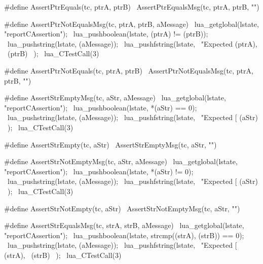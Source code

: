 #define AssertPtrEquals(tc, ptrA, ptrB) \
  AssertPtrEqualsMsg(tc, ptrA, ptrB, "")
\stopCHeader

\stopTestSuite

\startTestSuite[assertPtrNotEquals]

\startCHeader
#define AssertPtrNotEqualsMsg(tc, ptrA, ptrB, aMessage) \
  lua_getglobal(lstate, "reportCAssertion");            \
  lua_pushboolean(lstate, (ptrA) != (ptrB));            \
  lua_pushstring(lstate, (aMessage));                   \
  lua_pushfstring(lstate,                               \
      "Expected %
      (ptrA),                                           \
      (ptrB)                                            \
    );                                                  \
  lua_CTestCall(3)

#define AssertPtrNotEquals(tc, ptrA, ptrB) \
  AssertPtrNotEqualsMsg(tc, ptrA, ptrB, "")
\stopCHeader

\stopTestSuite

\startTestSuite[assertStrEmpty]

\startCHeader
#define AssertStrEmptyMsg(tc, aStr, aMessage) \
  lua_getglobal(lstate, "reportCAssertion");  \
  lua_pushboolean(lstate, *(aStr) == 0);      \
  lua_pushstring(lstate, (aMessage));         \
  lua_pushfstring(lstate,                     \
      "Expected [%
      (aStr)                                  \
    );                                        \
  lua_CTestCall(3)

#define AssertStrEmpty(tc, aStr) \
  AssertStrEmptyMsg(tc, aStr, "")
\stopCHeader

\stopTestSuite

\startTestSuite[assertStrNotEmpty]

\startCHeader
#define AssertStrNotEmptyMsg(tc, aStr, aMessage) \
  lua_getglobal(lstate, "reportCAssertion");     \
  lua_pushboolean(lstate, *(aStr) != 0);         \
  lua_pushstring(lstate, (aMessage));            \
  lua_pushfstring(lstate,                        \
      "Expected [%
      (aStr)                                     \
    );                                           \
  lua_CTestCall(3)

#define AssertStrNotEmpty(tc, aStr) \
  AssertStrNotEmptyMsg(tc, aStr, "")
\stopCHeader

\stopTestSuite

\startTestSuite[assertStrEquals]

\startCHeader
#define AssertStrEqualsMsg(tc, strA, strB, aMessage)    \
  lua_getglobal(lstate, "reportCAssertion");            \
  lua_pushboolean(lstate, strcmp((strA), (strB)) == 0); \
  lua_pushstring(lstate, (aMessage));                   \
  lua_pushfstring(lstate,                               \
      "Expected [%
      (strA),                                           \
      (strB)                                            \
    );                                                  \
  lua_CTestCall(3)

